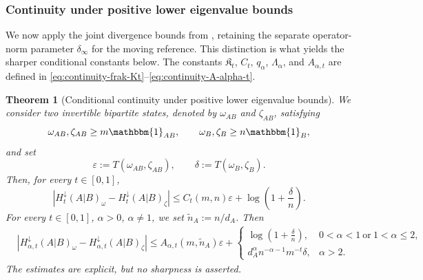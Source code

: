 \documentclass[11pt]{article}
\newtheorem{theorem}[theorem]{Theorem}
\theoremstyle{remark}
\newcommand{\1}{\mathbbm{1}}
\begin{document}
\subsubsection{Continuity under positive lower eigenvalue bounds}
\label{subsec:conditional-spectral-slab-bounds}

We now apply the joint divergence bounds from
, retaining the separate
operator-norm parameter $\delta_\infty$ for the moving reference.
This distinction is what yields the sharper conditional constants
below.  The constants
$\mathfrak K_t$, $C_t$, $q_\alpha$, $\Lambda_\alpha$, and
$A_{\alpha,t}$ are defined in
\eqref{eq:continuity-frak-Kt}--\eqref{eq:continuity-A-alpha-t}.

\begin{theorem}[Conditional continuity under positive lower
eigenvalue bounds]
\label{theo:conditional-geodesic-slab-continuity}
We consider two invertible bipartite states, denoted by
$\omega_{AB}$ and $\zeta_{AB}$, satisfying
\begin{equation}
 \omega_{AB},\zeta_{AB}\geq m\1_{AB},
 \qquad
 \omega_B,\zeta_B\geq n\1_B,
 \label{eq:conditional-common-spectral-slab}
\end{equation}
and set
\begin{equation}
 \varepsilon:=T(\omega_{AB},\zeta_{AB}),
 \qquad
 \delta:=T(\omega_B,\zeta_B).
 \label{eq:conditional-two-distances}
\end{equation}
Then, for every $t\in[0,1]$,
\begin{equation}
 \left|H_t^\downarrow(A|B)_\omega
       -H_t^\downarrow(A|B)_\zeta\right|
 \leq C_t(m,n)\varepsilon
       +\log\left(1+\frac{\delta}{n}\right).
 \label{eq:conditional-Dt-slab-bound}
\end{equation}
For every $t\in[0,1]$, $\alpha>0$, $\alpha\neq1$, we set
$\widetilde n_A:=n/d_A$.  Then
\begin{equation}
 \begin{aligned}
 &\left|H_{\alpha,t}^\downarrow(A|B)_\omega
       -H_{\alpha,t}^\downarrow(A|B)_\zeta\right|\leq A_{\alpha,t}(m,\widetilde n_A)\varepsilon
 +\begin{cases}
 \displaystyle\log\left(1+\frac{\delta}{n}\right),
 &0<\alpha<1\ \text{or}\ 1<\alpha\leq2,\\[2mm]
 \displaystyle d_A^\alpha n^{-\alpha-1}m^{-t}\delta,
 &\alpha>2.
 \end{cases}
 \end{aligned}
 \label{eq:conditional-Dalpha-t-slab-bound}
\end{equation}
The estimates are explicit, but no sharpness is asserted.
\end{theorem}
\end{document}
